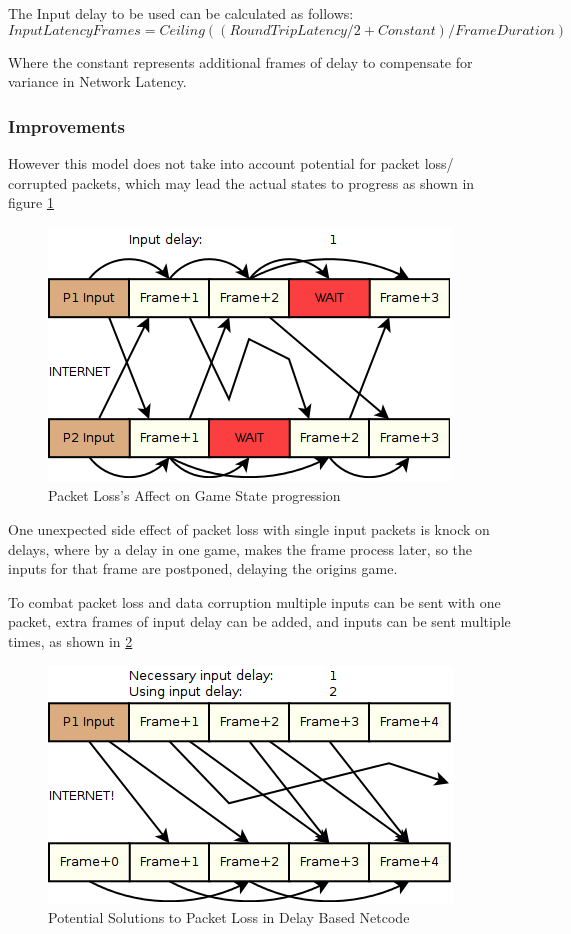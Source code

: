 \documentclass{entcs}
\begin{document}
The Input delay to be used can be calculated as follows:
\[InputLatencyFrames = Ceiling( (RoundTripLatency/2 + Constant) / FrameDuration )\]

Where the constant represents additional frames of delay to compensate for variance in Network Latency.

\subsubsection{Improvements}
However this model does not take into account potential for packet loss/ corrupted packets, which may lead the actual states to progress as shown in figure \ref{fig:PacketLossEffect}

\begin{figure}[h]
\centering
\includegraphics{PacketLossEffect}
\caption{Packet Loss's Affect on Game State progression \cite{FightingGameNetworking}}
\label{fig:PacketLossEffect}
\end{figure}

One unexpected side effect of packet loss with single input packets is knock on delays, where by a delay in one game, makes the frame process later, so the inputs for that frame are postponed, delaying the origins game.

To combat packet loss and data corruption multiple inputs can be sent with one packet, extra frames of input delay can be added, and inputs can be sent multiple times, as shown in \ref{fig:PacketLossSoultions}

\begin{figure}[h]
\centering
\includegraphics{PacketLossSoultions}
\caption{Potential Solutions to Packet Loss in Delay Based Netcode \cite{FightingGameNetworking}}
\label{fig:PacketLossSoultions}
\end{figure}
\end{document}
